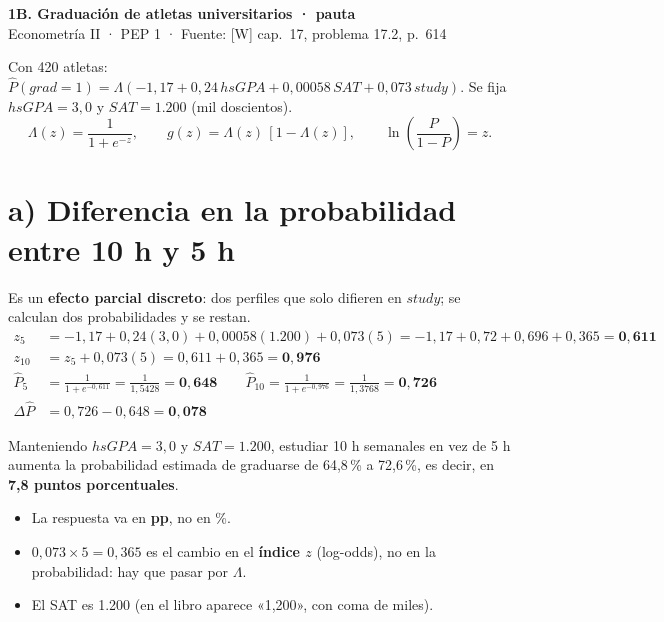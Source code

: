 \documentclass[11pt,a4paper]{article}
\begin{document}
\begin{center}
{\Large\bfseries 1B. Graduación de atletas universitarios · pauta}\\[2pt]
Econometría II · PEP 1 · Fuente: [W] cap.\ 17, problema 17.2, p.\ 614
\end{center}

\noindent Con 420 atletas: $\hat P(grad=1)=\Lambda(-1{,}17+0{,}24\,hsGPA+0{,}00058\,SAT+0{,}073\,study)$. Se fija $hsGPA=3{,}0$ y $SAT=1.200$ (mil doscientos).
\[
\Lambda(z)=\frac{1}{1+e^{-z}},\qquad g(z)=\Lambda(z)\,[1-\Lambda(z)],\qquad \ln\!\left(\frac{P}{1-P}\right)=z .
\]

\section*{a) Diferencia en la probabilidad entre 10 h y 5 h}
Es un \textbf{efecto parcial discreto}: dos perfiles que solo difieren en $study$; se calculan dos probabilidades y se restan.
\begin{align*}
z_5 &= -1{,}17+0{,}24(3{,}0)+0{,}00058(1.200)+0{,}073(5)=-1{,}17+0{,}72+0{,}696+0{,}365=\mathbf{0{,}611}\\
z_{10} &= z_5+0{,}073(5)=0{,}611+0{,}365=\mathbf{0{,}976}\\[4pt]
\hat P_5 &= \frac{1}{1+e^{-0{,}611}}=\frac{1}{1{,}5428}=\mathbf{0{,}648}
\qquad
\hat P_{10} = \frac{1}{1+e^{-0{,}976}}=\frac{1}{1{,}3768}=\mathbf{0{,}726}\\[4pt]
\Delta\hat P &= 0{,}726-0{,}648=\mathbf{0{,}078}
\end{align*}
\begin{ejemplar}
Manteniendo $hsGPA=3{,}0$ y $SAT=1.200$, estudiar 10 h semanales en vez de 5 h aumenta la probabilidad estimada de graduarse de 64,8\,\% a 72,6\,\%, es decir, en \textbf{7,8 puntos porcentuales}.
\end{ejemplar}
\begin{trampa}
\begin{itemize}[leftmargin=*,itemsep=0pt,topsep=0pt]
\item La respuesta va en \textbf{pp}, no en \%.
\item $0{,}073\times5=0{,}365$ es el cambio en el \textbf{índice $z$} (log-odds), no en la probabilidad: hay que pasar por $\Lambda$.
\item El SAT es 1.200 (en el libro aparece «1,200», con coma de miles).
\end{itemize}
\end{trampa}
\end{document}
